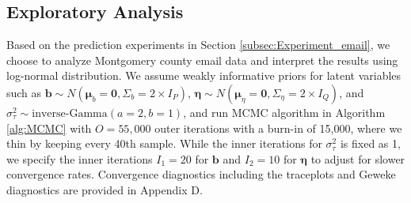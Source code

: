 \documentclass[ba]{imsart}
\numberwithin{equation}{section}
\theoremstyle{plain}
\begin{document}
	\subsection{Exploratory Analysis}\label{subsec:Result_email}
	Based on the prediction experiments in Section \ref{subsec:Experiment_email}, we choose to analyze Montgomery county email data and interpret the results using log-normal distribution. We assume weakly informative priors for latent variables such as $\boldsymbol{b}\sim N(\boldsymbol{\mu}_b=\boldsymbol{0}, \Sigma_b = 2\times I_P)$, $\boldsymbol{\eta}\sim N(\boldsymbol{\mu}_\eta=\boldsymbol{0}, \Sigma_\eta = 2\times I_Q)$, and $\sigma_\tau^2 \sim \mbox{inverse-Gamma}(a=2, b=1)$, and run MCMC algorithm in Algorithm \ref{alg:MCMC} with $O=55,000$ outer iterations with a burn-in of 15,000, where we thin by keeping every 40th sample. While the inner iterations for $\sigma_\tau^2$ is fixed as 1, we specify the inner iterations $I_1=20$ for $\boldsymbol{b}$ and $I_2=10$ for $\boldsymbol{\eta}$ to adjust for slower convergence rates. Convergence diagnostics including the traceplots and Geweke diagnostics \citep{geweke1991evaluating} are provided in Appendix D.
\end{document}
